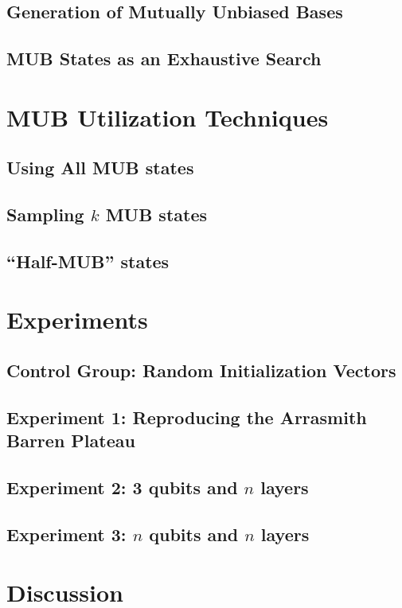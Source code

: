 \documentclass[a4paper,12pt]{article}
\begin{document}
\subsection{Generation of Mutually Unbiased Bases}

\subsection{MUB States as an Exhaustive Search}


\section{MUB Utilization Techniques}

\subsection{Using All MUB states}

\subsection{Sampling $k$ MUB states}

\subsection{``Half-MUB'' states}


\section{Experiments}

\subsection{Control Group: Random Initialization Vectors}

\subsection{Experiment 1: Reproducing the Arrasmith Barren Plateau}

\subsection{Experiment 2: 3 qubits and $n$ layers}

\subsection{Experiment 3: $n$ qubits and $n$ layers}

\section{Discussion}

\printbibliography
\end{document}
